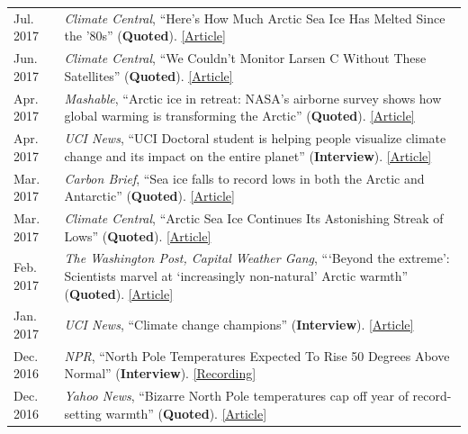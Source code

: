 \documentclass[margin,line,palatino,courier,10pt]{res}
\begin{document}
\begin{resume}
\begin{tabular}{@{}p{0.9in}p{4in}}
Jul. 2017 & \textit{Climate Central}, ``Here's How Much Arctic Sea Ice Has Melted Since the '80s'' (\textbf{Quoted}). \href{http://www.climatecentral.org/news/arctic-sea-ice-melt-since-the-80s-21637}{[Article]}\\
Jun. 2017 & \textit{Climate Central}, ``We Couldn't Monitor Larsen C Without These Satellites'' (\textbf{Quoted}). \href{http://www.climatecentral.org/news/larsen-c-monitoring-satellites-21564}{[Article]}\\
Apr. 2017 & \textit{Mashable}, ``Arctic ice in retreat: NASA's airborne survey shows how global warming is transforming the Arctic'' (\textbf{Quoted}). \href{http://mashable.com/2017/04/13/arctic-meltdown-nasa-photos-changing-ice/?utm_cid=hp-n-1#BgdepWyM6Pq3}{[Article]}\\
Apr. 2017 & \textit{UCI News}, ``UCI Doctoral student is helping people visualize climate change and its impact on the entire planet'' (\textbf{Interview}). \href{http://grad.uci.edu/news-and-events/student-spotlights/Zachary-Labe.html}{[Article]}\\
Mar. 2017 & \textit{Carbon Brief}, ``Sea ice falls to record lows in both the Arctic and Antarctic'' (\textbf{Quoted}). \href{https://www.carbonbrief.org/sea-ice-falls-record-lows-arctic-antarctic}{[Article]}\\
Mar. 2017 & \textit{Climate Central}, ``Arctic Sea Ice Continues Its Astonishing Streak of Lows'' (\textbf{Quoted}). \href{http://www.climatecentral.org/news/arctic-sea-ice-record-low-streak-21227}{[Article]}\\
Feb. 2017 & \textit{The Washington Post, Capital Weather Gang}, ```Beyond the extreme': Scientists marvel at `increasingly non-natural' Arctic warmth'' (\textbf{Quoted}). \href{https://www.washingtonpost.com/news/capital-weather-gang/wp/2017/02/01/beyond-the-extreme-scientists-marvel-at-increasingly-non-natural-arctic-warmth/?sdfsdfsdfsdfsd&utm_term=.cf3cf81d24f3}{[Article]}\\
Jan. 2017 & \textit{UCI News}, ``Climate change champions'' (\textbf{Interview}). \href{https://news.uci.edu/climate-change-champions/}{[Article]}\\
Dec. 2016 & \textit{NPR}, ``North Pole Temperatures Expected To Rise 50 Degrees Above Normal'' (\textbf{Interview}). \href{http://www.npr.org/2016/12/21/506483966/north-pole-temperatures-expected-to-rise-50-degrees-above-normal}{[Recording]}\\
Dec. 2016 & \textit{Yahoo News}, ``Bizarre North Pole temperatures cap off year of record-setting warmth'' (\textbf{Quoted}). \href{https://www.yahoo.com/news/bizarre-north-pole-temperatures-cap-off-year-of-record-setting-warmth-181727978.html?soc_src=social-sh&soc_trk=tw}{[Article]}\\

\end{tabular}
\end{resume}
\end{document}
